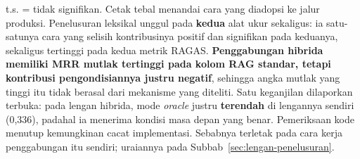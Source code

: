 \begin{table}[htbp]
\vspace{2pt}
{\footnotesize t.s. = tidak signifikan. Cetak tebal menandai cara yang diadopsi ke jalur produksi. Penelusuran leksikal unggul pada \textbf{kedua} alat ukur sekaligus: ia satu-satunya cara yang selisih kontribusinya positif dan signifikan pada keduanya, sekaligus tertinggi pada kedua metrik RAGAS. \textbf{Penggabungan hibrida memiliki MRR mutlak tertinggi pada kolom RAG standar, tetapi kontribusi pengondisiannya justru negatif}, sehingga angka mutlak yang tinggi itu tidak berasal dari mekanisme yang diteliti. Satu keganjilan dilaporkan terbuka: pada lengan hibrida, mode \emph{oracle} justru \textbf{terendah} di lengannya sendiri (0,336), padahal ia menerima kondisi masa depan yang benar. Pemeriksaan kode menutup kemungkinan cacat implementasi. Sebabnya terletak pada cara kerja penggabungan itu sendiri; uraiannya pada Subbab~\ref{sec:lengan-penelusuran}.}
\end{table}
